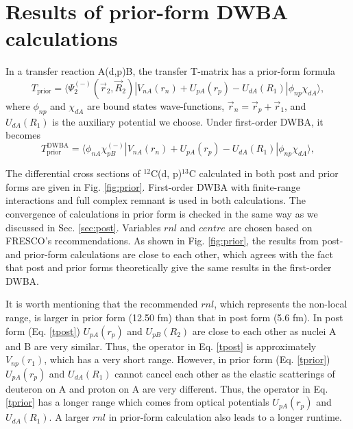 \section{Results of prior-form DWBA calculations}
In a transfer reaction A(d,p)B, the transfer T-matrix has a prior-form formula \cite{thompson2009nuclear}
\begin{equation}\label{eq:priorexact}
T_{\mathrm{prior}}=\langle\Psi_2^{(-)}(\vec{r}_2,\vec{R}_2)\left|V_{nA}(r_n)+U_{pA}(r_p)-U_{dA}(R_1)\right|\phi_{np}\chi_{dA}\rangle,
\end{equation}
where $\phi_{np}$ and $\chi_{dA}$ are bound states wave-functions, $\vec{r}_n=\vec{r}_p+\vec{r}_1$, 
and $U_{dA}(R_1)$ is the auxiliary potential we choose. 
Under first-order DWBA, it becomes
\begin{equation}\label{tprior}
T_{\mathrm{prior}}^{\mathrm{DWBA}}=\langle\phi_{nA}\chi_{pB}^{(-)}\left|V_{nA}(r_n)+U_{pA}(r_p)-U_{dA}(R_1)\right|\phi_{np}\chi_{dA}\rangle,
\end{equation}
\par
The differential cross sections of $^{12}$C(d, p)$^{13}$C calculated in both post and prior forms are given in Fig. \ref{fig:prior}. 
First-order DWBA with finite-range interactions and full complex remnant is used in both calculations. 
The convergence of calculations in prior form is checked in the same way as we discussed in Sec. \ref{sec:post}. 
Variables $rnl$ and $centre$ are chosen based on FRESCO's recommendations. 
As shown in Fig. \ref{fig:prior}, the results from post- and prior-form calculations are close to each other, 
which agrees with the fact that post and prior forms theoretically give the same results in the first-order DWBA. 
\par
It is worth mentioning that the recommended $rnl$, which represents the non-local range, is larger in prior form (12.50 fm) than that in post form (5.6 fm). 
In post form (Eq. \ref{tpost}) $U_{pA}(r_p)$ and $U_{pB}(R_2)$ are close to each other as nuclei A and B are very similar. 
Thus, the operator in Eq. \ref{tpost} is approximately $V_{np}(r_1)$, which has a very short range. 
However, in prior form (Eq. \ref{tprior}) $U_{pA}(r_p)$ and $U_{dA}(R_1)$ cannot cancel each other as the elastic scatterings of deuteron on A and proton on A are very different. 
Thus, the operator in Eq. \ref{tprior} has a longer range which comes from optical potentials $U_{pA}(r_p)$ and $U_{dA}(R_1)$. 
A larger $rnl$ in prior-form calculation also leads to a longer runtime. 
